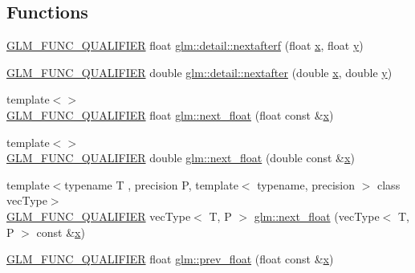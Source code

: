 \subsection*{Functions}
\begin{DoxyCompactItemize}
\item 
\mbox{\hyperlink{setup_8hpp_a33fdea6f91c5f834105f7415e2a64407}{G\+L\+M\+\_\+\+F\+U\+N\+C\+\_\+\+Q\+U\+A\+L\+I\+F\+I\+ER}} float \mbox{\hyperlink{namespaceglm_1_1detail_ab0eb795c482130b1d6c83470bdb031e6}{glm\+::detail\+::nextafterf}} (float \mbox{\hyperlink{glad_8h_a92d0386e5c19fb81ea88c9f99644ab1d}{x}}, float \mbox{\hyperlink{glad_8h_a66ddd433d2cacfe27f5906b7e86faeed}{y}})
\item 
\mbox{\hyperlink{setup_8hpp_a33fdea6f91c5f834105f7415e2a64407}{G\+L\+M\+\_\+\+F\+U\+N\+C\+\_\+\+Q\+U\+A\+L\+I\+F\+I\+ER}} double \mbox{\hyperlink{namespaceglm_1_1detail_a3c14f8400407e8b4cff5be12ceef2c1e}{glm\+::detail\+::nextafter}} (double \mbox{\hyperlink{glad_8h_a92d0386e5c19fb81ea88c9f99644ab1d}{x}}, double \mbox{\hyperlink{glad_8h_a66ddd433d2cacfe27f5906b7e86faeed}{y}})
\item 
{\footnotesize template$<$$>$ }\\\mbox{\hyperlink{setup_8hpp_a33fdea6f91c5f834105f7415e2a64407}{G\+L\+M\+\_\+\+F\+U\+N\+C\+\_\+\+Q\+U\+A\+L\+I\+F\+I\+ER}} float \mbox{\hyperlink{namespaceglm_a094d145a4ae8efb9e42e88883cfb15f1}{glm\+::next\+\_\+float}} (float const \&\mbox{\hyperlink{glad_8h_a92d0386e5c19fb81ea88c9f99644ab1d}{x}})
\item 
{\footnotesize template$<$$>$ }\\\mbox{\hyperlink{setup_8hpp_a33fdea6f91c5f834105f7415e2a64407}{G\+L\+M\+\_\+\+F\+U\+N\+C\+\_\+\+Q\+U\+A\+L\+I\+F\+I\+ER}} double \mbox{\hyperlink{namespaceglm_a451149113e1a5083fcba0546de81ad51}{glm\+::next\+\_\+float}} (double const \&\mbox{\hyperlink{glad_8h_a92d0386e5c19fb81ea88c9f99644ab1d}{x}})
\item 
{\footnotesize template$<$typename T , precision P, template$<$ typename, precision $>$ class vec\+Type$>$ }\\\mbox{\hyperlink{setup_8hpp_a33fdea6f91c5f834105f7415e2a64407}{G\+L\+M\+\_\+\+F\+U\+N\+C\+\_\+\+Q\+U\+A\+L\+I\+F\+I\+ER}} vec\+Type$<$ T, P $>$ \mbox{\hyperlink{namespaceglm_a7e678a59e625a9453c8847e3d0e01625}{glm\+::next\+\_\+float}} (vec\+Type$<$ T, P $>$ const \&\mbox{\hyperlink{glad_8h_a92d0386e5c19fb81ea88c9f99644ab1d}{x}})
\item 
\mbox{\hyperlink{setup_8hpp_a33fdea6f91c5f834105f7415e2a64407}{G\+L\+M\+\_\+\+F\+U\+N\+C\+\_\+\+Q\+U\+A\+L\+I\+F\+I\+ER}} float \mbox{\hyperlink{namespaceglm_a1fd407652d7ccfbe810674a2e5cbc8eb}{glm\+::prev\+\_\+float}} (float const \&\mbox{\hyperlink{glad_8h_a92d0386e5c19fb81ea88c9f99644ab1d}{x}})

\end{DoxyCompactItemize}
